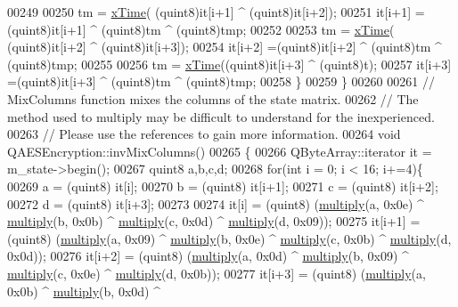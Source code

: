 \begin{DoxyCode}
00249 
00250     tm      = \hyperlink{qaesencryption_8cpp_a94a5c6f286db021d028ddc6f91a65f72}{xTime}( (quint8)it[i+1] ^ (quint8)it[i+2]);
00251     it[i+1] = (quint8)it[i+1] ^ (quint8)tm ^ (quint8)tmp;
00252 
00253     tm      = \hyperlink{qaesencryption_8cpp_a94a5c6f286db021d028ddc6f91a65f72}{xTime}( (quint8)it[i+2] ^ (quint8)it[i+3]);
00254     it[i+2] =(quint8)it[i+2] ^ (quint8)tm ^ (quint8)tmp;
00255 
00256     tm      = \hyperlink{qaesencryption_8cpp_a94a5c6f286db021d028ddc6f91a65f72}{xTime}((quint8)it[i+3] ^ (quint8)t);
00257     it[i+3] =(quint8)it[i+3] ^ (quint8)tm ^ (quint8)tmp;
00258   \}
00259 \}
00260 
00261 \textcolor{comment}{// MixColumns function mixes the columns of the state matrix.}
00262 \textcolor{comment}{// The method used to multiply may be difficult to understand for the inexperienced.}
00263 \textcolor{comment}{// Please use the references to gain more information.}
00264 \textcolor{keywordtype}{void} QAESEncryption::invMixColumns()
00265 \{
00266   QByteArray::iterator it = m\_state->begin();
00267   quint8 a,b,c,d;
00268   \textcolor{keywordflow}{for}(\textcolor{keywordtype}{int} i = 0; i < 16; i+=4)\{
00269     a = (quint8) it[i];
00270     b = (quint8) it[i+1];
00271     c = (quint8) it[i+2];
00272     d = (quint8) it[i+3];
00273 
00274     it[i]   = (quint8) (\hyperlink{qaesencryption_8cpp_adcc23c7a5520793f14710fff6ef23dfe}{multiply}(a, 0x0e) ^ \hyperlink{qaesencryption_8cpp_adcc23c7a5520793f14710fff6ef23dfe}{multiply}(b, 0x0b) ^ 
      \hyperlink{qaesencryption_8cpp_adcc23c7a5520793f14710fff6ef23dfe}{multiply}(c, 0x0d) ^ \hyperlink{qaesencryption_8cpp_adcc23c7a5520793f14710fff6ef23dfe}{multiply}(d, 0x09));
00275     it[i+1] = (quint8) (\hyperlink{qaesencryption_8cpp_adcc23c7a5520793f14710fff6ef23dfe}{multiply}(a, 0x09) ^ \hyperlink{qaesencryption_8cpp_adcc23c7a5520793f14710fff6ef23dfe}{multiply}(b, 0x0e) ^ 
      \hyperlink{qaesencryption_8cpp_adcc23c7a5520793f14710fff6ef23dfe}{multiply}(c, 0x0b) ^ \hyperlink{qaesencryption_8cpp_adcc23c7a5520793f14710fff6ef23dfe}{multiply}(d, 0x0d));
00276     it[i+2] = (quint8) (\hyperlink{qaesencryption_8cpp_adcc23c7a5520793f14710fff6ef23dfe}{multiply}(a, 0x0d) ^ \hyperlink{qaesencryption_8cpp_adcc23c7a5520793f14710fff6ef23dfe}{multiply}(b, 0x09) ^ 
      \hyperlink{qaesencryption_8cpp_adcc23c7a5520793f14710fff6ef23dfe}{multiply}(c, 0x0e) ^ \hyperlink{qaesencryption_8cpp_adcc23c7a5520793f14710fff6ef23dfe}{multiply}(d, 0x0b));
00277     it[i+3] = (quint8) (\hyperlink{qaesencryption_8cpp_adcc23c7a5520793f14710fff6ef23dfe}{multiply}(a, 0x0b) ^ \hyperlink{qaesencryption_8cpp_adcc23c7a5520793f14710fff6ef23dfe}{multiply}(b, 0x0d) ^ 

\end{DoxyCode}
